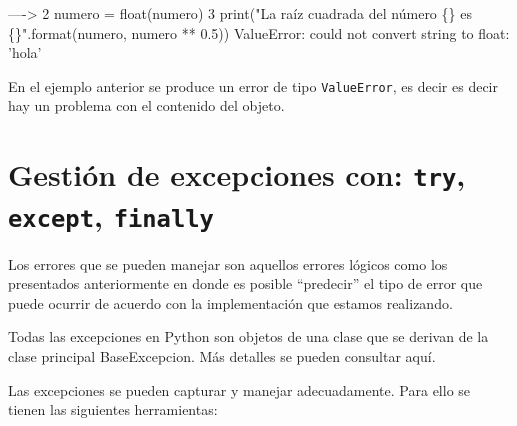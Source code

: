 \documentclass[
  spanish,
  letterpaper,
]{scrbook}
\theoremstyle{definition}
\theoremstyle{remark}
\begin{document}
\begin{Highlighting}
\textcolor{QuartoInternalColor2}{}\textcolor{QuartoInternalColor4}{----> }\textcolor{QuartoInternalColor2}{}\textcolor{QuartoInternalColor4}{2}\textcolor{QuartoInternalColor2}{     numero = }\textcolor{QuartoInternalColor5}{float}\textcolor{QuartoInternalColor2}{}\textcolor{QuartoInternalColor2}{(}\textcolor{QuartoInternalColor2}{}\textcolor{QuartoInternalColor2}{numero}\textcolor{QuartoInternalColor2}{}\textcolor{QuartoInternalColor2}{)}\textcolor{QuartoInternalColor2}{}
\textcolor{QuartoInternalColor2}{}\textcolor{QuartoInternalColor4}{      3}\textcolor{QuartoInternalColor2}{     }\textcolor{QuartoInternalColor5}{print}\textcolor{QuartoInternalColor2}{(}\textcolor{QuartoInternalColor6}{"}\textcolor{QuartoInternalColor2}{}\textcolor{QuartoInternalColor6}{La raíz cuadrada del número }\textcolor{QuartoInternalColor2}{}\textcolor{QuartoInternalColor8}{\{\}}\textcolor{QuartoInternalColor2}{}\textcolor{QuartoInternalColor6}{ es }\textcolor{QuartoInternalColor2}{}\textcolor{QuartoInternalColor8}{\{\}}\textcolor{QuartoInternalColor2}{}\textcolor{QuartoInternalColor6}{"}\textcolor{QuartoInternalColor2}{.format(numero, numero ** }\textcolor{QuartoInternalColor4}{0.5}\textcolor{QuartoInternalColor2}{))}
\textcolor{QuartoInternalColor2}{}\textcolor{QuartoInternalColor1}{ValueError}\textcolor{QuartoInternalColor2}{: could not convert string to float: 'hola'}
\end{Highlighting}

En el ejemplo anterior se produce un error de tipo \texttt{ValueError},
es decir es decir hay un problema con el contenido del objeto.

\section{\texorpdfstring{Gestión de excepciones con: \texttt{try},
\texttt{except},
\texttt{finally}}{Gestión de excepciones con: try, except, finally}}\label{gestiuxf3n-de-excepciones-con-try-except-finally}

Los errores que se pueden manejar son aquellos errores lógicos como los
presentados anteriormente en donde es posible ``predecir'' el tipo de
error que puede ocurrir de acuerdo con la implementación que estamos
realizando.

Todas las excepciones en Python son objetos de una clase que se derivan
de la clase principal BaseExcepcion. Más detalles se pueden consultar
aquí.

Las excepciones se pueden capturar y manejar adecuadamente. Para ello se
tienen las siguientes herramientas:
\end{document}
